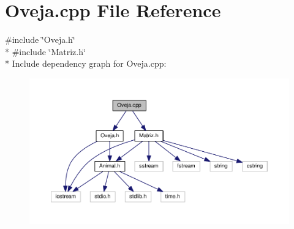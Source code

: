 \section{Oveja.\-cpp File Reference}
\label{_oveja_8cpp}
{\ttfamily \#include \char`\"{}Oveja.\-h\char`\"{}}\\*
{\ttfamily \#include \char`\"{}Matriz.\-h\char`\"{}}\\*
Include dependency graph for Oveja.\-cpp\-:
\nopagebreak
\begin{figure}[H]
\begin{center}
\leavevmode
\includegraphics[width=350pt]{_oveja_8cpp__incl}
\end{center}
\end{figure}
